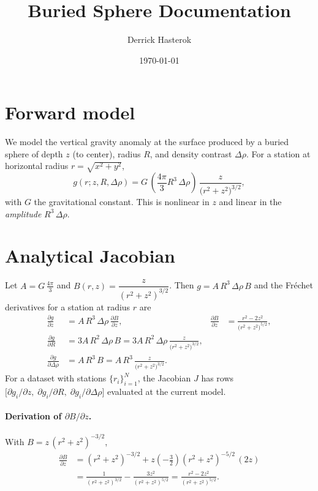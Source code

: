 \documentclass[11pt,a4paper]{article}
\title{Buried Sphere Documentation}
\author{Derrick Hasterok}
\date{\today}
\begin{document}
\maketitle

\section*{Forward model}
We model the vertical gravity anomaly at the surface produced by a buried sphere of depth $z$ (to center), radius $R$, and density contrast $\Delta\rho$. For a station at horizontal radius $r=\sqrt{x^2+y^2}$,
\begin{equation}
  g(r;z,R,\Delta\rho) = G\,\left(\frac{4\pi}{3} R^3\,\Delta\rho\right)\,\frac{z}{\bigl(r^2+z^2\bigr)^{3/2}},
  \label{eq:forward}
\end{equation}
with $G$ the gravitational constant. This is nonlinear in $z$ and linear in the \emph{amplitude} $R^3\,\Delta\rho$.

\section*{Analytical Jacobian}
Let $A = G\,\tfrac{4\pi}{3}$ and $B(r,z)=\dfrac{z}{(r^2+z^2)^{3/2}}$. Then $g = A\,R^3\,\Delta\rho\,B$ and the Fréchet derivatives for a station at radius $r$ are
\begin{align}
  \frac{\partial g}{\partial z} &= A\,R^3\,\Delta\rho\,\frac{\partial B}{\partial z},
  & \frac{\partial B}{\partial z} &= \frac{r^2-2z^2}{\bigl(r^2+z^2\bigr)^{5/2}}, \\
  \frac{\partial g}{\partial R} &= 3A\,R^2\,\Delta\rho\,B = 3A\,R^2\,\Delta\rho\,\frac{z}{\bigl(r^2+z^2\bigr)^{3/2}}, \\
  \frac{\partial g}{\partial \Delta\rho} &= A\,R^3\,B = A\,R^3\,\frac{z}{\bigl(r^2+z^2\bigr)^{3/2}}.
\end{align}
For a dataset with stations $\{r_i\}_{i=1}^N$, the Jacobian $J$ has rows $\bigl[\partial g_i/\partial z,\;\partial g_i/\partial R,\;\partial g_i/\partial \Delta\rho\bigr]$ evaluated at the current model.

\paragraph{Derivation of $\partial B/\partial z$.}
With $B=z\,(r^2+z^2)^{-3/2}$,
\begin{align}
  \frac{\partial B}{\partial z}
  &= (r^2+z^2)^{-3/2} + z\left(-\tfrac{3}{2}\right)(r^2+z^2)^{-5/2}\,(2z) \\
  &= \frac{1}{(r^2+z^2)^{3/2}} - \frac{3z^2}{(r^2+z^2)^{5/2}}
   = \frac{r^2-2z^2}{(r^2+z^2)^{5/2}}.
\end{align}
\end{document}
